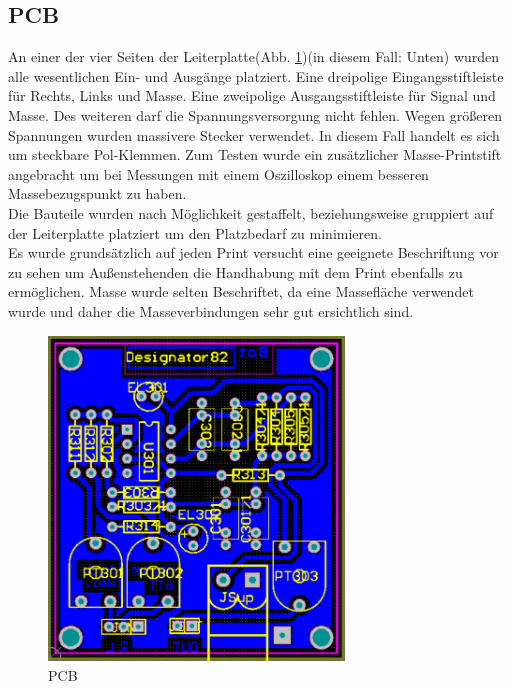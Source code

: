 \subsection{PCB}\label{subsec:4.2.4}
An einer der vier Seiten der Leiterplatte(Abb. \ref{fig:4.2.4.1})(in diesem Fall: Unten) wurden alle wesentlichen Ein- und Ausgänge platziert. Eine dreipolige Eingangsstiftleiste für Rechts, Links und Masse. Eine zweipolige Ausgangsstiftleiste für Signal und Masse. Des weiteren darf die Spannungsversorgung nicht fehlen. Wegen größeren Spannungen wurden massivere Stecker verwendet. In diesem Fall handelt es sich um steckbare Pol-Klemmen. Zum Testen wurde ein zusätzlicher Masse-Printstift angebracht um bei Messungen mit einem Oszilloskop einem besseren Massebezugspunkt zu haben.\\
Die Bauteile wurden nach Möglichkeit gestaffelt, beziehungsweise gruppiert auf der Leiterplatte platziert um den Platzbedarf zu minimieren.\\
Es wurde grundsätzlich auf jeden Print versucht eine geeignete Beschriftung vor zu sehen um Außenstehenden die Handhabung mit dem Print ebenfalls zu ermöglichen. Masse wurde selten Beschriftet, da eine Massefläche verwendet wurde und daher die Masseverbindungen sehr gut ersichtlich sind.
\begin{figure} [H]
	\centering
	\includegraphics[width=0.7\textwidth]{img/Print3/3mTTWeicheruAddierer-PCB.PNG}
	\caption{PCB}
	\label {fig:4.2.4.1}
\end{figure}










